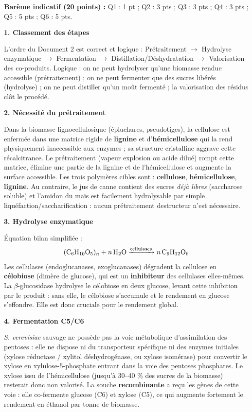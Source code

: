 \documentclass[11pt]{article}
\begin{document}
\begin{corrige}
\textbf{Barème indicatif (20 points) :} Q1 : 1 pt ; Q2 : 3 pts ; Q3 : 3 pts ; Q4 : 3 pts ; Q5 : 5 pts ; Q6 : 5 pts.

\textbf{1. Classement des étapes}

L'ordre du Document 2 est correct et logique : Prétraitement $\to$ Hydrolyse enzymatique $\to$ Fermentation $\to$ Distillation/Déshydratation $\to$ Valorisation des co-produits. Logique : on ne peut hydrolyser qu'une biomasse rendue accessible (prétraitement) ; on ne peut fermenter que des sucres libérés (hydrolyse) ; on ne peut distiller qu'un moût fermenté ; la valorisation des résidus clôt le procédé.

\textbf{2. Nécessité du prétraitement}

Dans la biomasse lignocellulosique (épluchures, pseudotiges), la cellulose est enfermée dans une matrice rigide de \textbf{lignine} et d'\textbf{hémicellulose} qui la rend physiquement inaccessible aux enzymes ; sa structure cristalline aggrave cette récalcitrance. Le prétraitement (vapeur explosion ou acide dilué) rompt cette matrice, élimine une partie de la lignine et de l'hémicellulose et augmente la surface accessible. Les trois polymères cibles sont : \textbf{cellulose}, \textbf{hémicellulose}, \textbf{lignine}. Au contraire, le jus de canne contient des sucres \emph{déjà libres} (saccharose soluble) et l'amidon du maïs est facilement hydrolysable par simple liquéfaction/saccharification : aucun prétraitement destructeur n'est nécessaire.

\textbf{3. Hydrolyse enzymatique}

Équation bilan simplifiée :
\[ \ce{(C6H10O5)_n + n H2O ->[cellulases] n C6H12O6} \]
Les cellulases (endoglucanases, exoglucanases) dégradent la cellulose en \textbf{célobiose} (dimère de glucose), qui est un \textbf{inhibiteur} des cellulases elles-mêmes. La $\beta$-glucosidase hydrolyse le célobiose en deux glucose, levant cette inhibition par le produit : sans elle, le célobiose s'accumule et le rendement en glucose s'effondre. Elle est donc cruciale pour le rendement global.

\textbf{4. Fermentation C5/C6}

\emph{S. cerevisiae} sauvage ne possède pas la voie métabolique d'assimilation des pentoses : elle ne dispose ni du transporteur spécifique ni des enzymes initiales (xylose réductase / xylitol déshydrogénase, ou xylose isomérase) pour convertir le xylose en xylulose-5-phosphate entrant dans la voie des pentoses phosphates. Le xylose issu de l'hémicellulose (jusqu'à 30--40 \% des sucres de la biomasse) resterait donc non valorisé. La souche \textbf{recombinante} a reçu les gènes de cette voie : elle co-fermente glucose (C6) et xylose (C5), ce qui augmente fortement le rendement en éthanol par tonne de biomasse.


\end{corrige}
\end{document}
